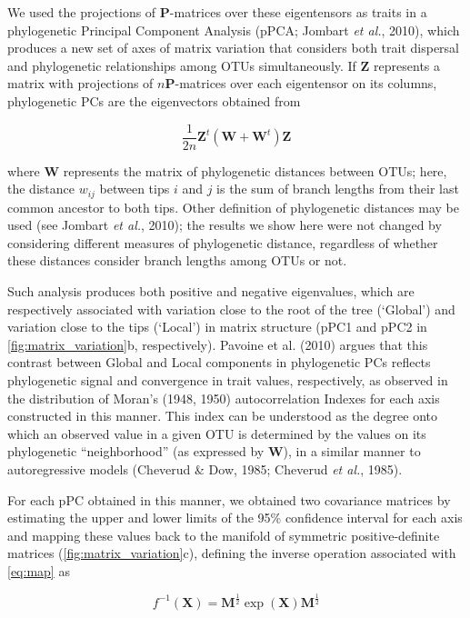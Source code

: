 \documentclass[12pt,twoside]{report}
\begin{document}
We used the projections of $\mathbf{P}$-matrices over these eigentensors
as traits in a phylogenetic Principal Component Analysis (pPCA; Jombart
\emph{et al.}, 2010), which produces a new set of axes of matrix
variation that considers both trait dispersal and phylogenetic
relationships among OTUs simultaneously. If $\mathbf{Z}$ represents a
matrix with projections of $n \mathbf{P}$-matrices over each eigentensor
on its columns, phylogenetic PCs are the eigenvectors obtained from

\begin{equation}
\frac{1}{2n} \mathbf{Z}^t(\mathbf{W} + \mathbf{W}^t) \mathbf{Z}
\end{equation}

where $\mathbf{W}$ represents the matrix of phylogenetic distances
between OTUs; here, the distance $w_{ij}$ between tips $i$ and $j$ is
the sum of branch lengths from their last common ancestor to both tips.
Other definition of phylogenetic distances may be used (see Jombart
\emph{et al.}, 2010); the results we show here were not changed by
considering different measures of phylogenetic distance, regardless of
whether these distances consider branch lengths among OTUs or not.

Such analysis produces both positive and negative eigenvalues, which are
respectively associated with variation close to the root of the tree
(`Global') and variation close to the tips (`Local') in matrix structure
(pPC1 and pPC2 in \autoref{fig:matrix_variation}b, respectively).
Pavoine et al. (2010) argues that this contrast between Global and Local
components in phylogenetic PCs reflects phylogenetic signal and
convergence in trait values, respectively, as observed in the
distribution of Moran's (1948, 1950) autocorrelation Indexes for each
axis constructed in this manner. This index can be understood as the
degree onto which an observed value in a given OTU is determined by the
values on its phylogenetic ``neighborhood'' (as expressed by
$\mathbf{W}$), in a similar manner to autoregressive models (Cheverud \&
Dow, 1985; Cheverud \emph{et al.}, 1985).

For each pPC obtained in this manner, we obtained two covariance
matrices by estimating the upper and lower limits of the 95\% confidence
interval for each axis and mapping these values back to the manifold of
symmetric positive-definite matrices (\autoref{fig:matrix_variation}c),
defining the inverse operation associated with \autoref{eq:map} as

\begin{equation}
f^{-1}(\mathbf{X}) = \mathbf{M}^{\frac{1}{2}}\exp(\mathbf{X})\mathbf{M}^{\frac{1}{2}}
\label{eq:inv}
\end{equation}
\end{document}
